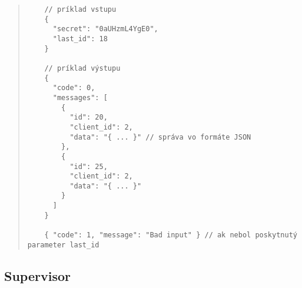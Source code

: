 \documentclass{article}
\begin{document}
\begin{quote}
  \begin{verbatim}
    // príklad vstupu
    {
      "secret": "0aUHzmL4YgE0",
      "last_id": 18
    }

    // príklad výstupu
    { 
      "code": 0,
      "messages": [
        {
          "id": 20,
          "client_id": 2,
          "data": "{ ... }" // správa vo formáte JSON
        },
        {
          "id": 25,
          "client_id": 2,
          "data": "{ ... }"
        }
      ]
    }

    { "code": 1, "message": "Bad input" } // ak nebol poskytnutý parameter last_id
  \end{verbatim}
  

\end{quote}

\subsection{Supervisor}
\end{document}
